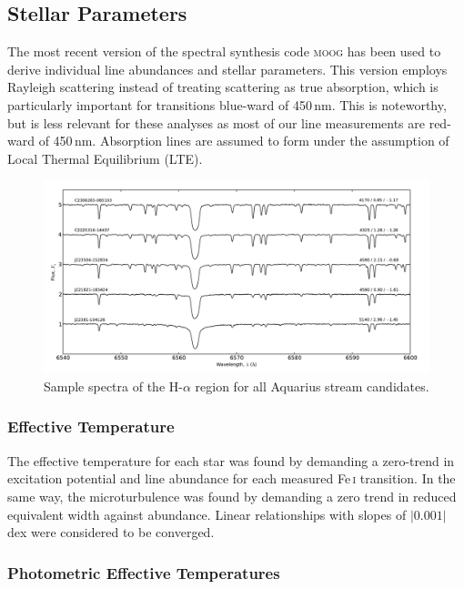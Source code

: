\documentclass{emulateapj}
\begin{document}
\subsection{Stellar Parameters}
The most recent version of the spectral synthesis code \textsc{moog} \citep{sneden;et-al_1973} has been used to derive individual line abundances and stellar parameters. This version employs Rayleigh scattering \citep{sobeck;et-al_2011} instead of treating scattering as true absorption, which is particularly important for transitions blue-ward of 450\,nm. This is noteworthy, but is less relevant for these analyses as most of our line measurements are red-ward of 450\,nm. Absorption lines are assumed to form under the assumption of Local Thermal Equilibrium (LTE). 

\begin{figure}[t!]
	\includegraphics[width=\textwidth]{./figures/spectra-h-alpha.pdf}
	\caption{Sample spectra of the H-$\alpha$ region for all Aquarius stream candidates.}
	\label{fig:spectra-h-alpha}
\end{figure}

\subsubsection{Effective Temperature}
\label{sec:effective-teffs}
The effective temperature for each star was found by demanding a zero-trend in excitation potential and line abundance for each measured Fe\,\textsc{i} transition. In the same way, the microturbulence was found by demanding a zero trend in reduced equivalent width against abundance. Linear relationships with slopes of $|0.001|$ dex were considered to be converged. 

\subsubsection{Photometric Effective Temperatures}
\label{sec:photometric-temperatures}
\end{document}
